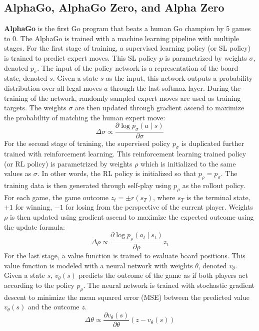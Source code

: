 \documentclass[12pt]{article}
\begin{document}
\subsection{AlphaGo, AlphaGo Zero, and Alpha Zero}
\textbf{AlphaGo} is the first Go program that beats a human Go champion by 5 games to 0.
The AlphaGo is trained with a machine learning pipeline with multiple stages.
For the first stage of training, a supervised learning policy (or SL policy) is trained to predict expert moves.
This SL policy $p$ is parametrized by weights $\sigma$, denoted $p_{\sigma}$.
The input of the policy network is a representation of the board state, denoted $s$.
Given a state $s$ as the input, this network outputs a probability distribution over all legal moves $a$ through the last softmax layer.
During the training of the network, randomly sampled expert moves are used as training targets.
The weights $\sigma$ are then updated through gradient ascend to maximize the probability of matching the human expert move:
$$
    \Delta \sigma \propto \frac{\partial \log p_{\sigma}(a \mid s)}{\partial \sigma}
$$
For the second stage of training, the supervised policy $p_{\sigma}$ is duplicated further trained with reinforcement learning.
This reinforcement learning trained policy (or RL policy) is parametrized by weights $\rho$ which is initialized to the same values as $\sigma$.
In other words, the RL policy is initialized so that $p_{\rho} = p_{\sigma}$.
The training data is then generated through self-play using $p_{\rho}$ as the rollout policy.
For each game, the game outcome $z_t = \pm r(s_T)$, where $s_T$ is the terminal state, $+1$ for winning, $-1$ for losing from the perspective of the current player.
Weights $\rho$ is then updated using gradient ascend to maximize the expected outcome using the update formula:
$$
    \Delta \rho \propto \frac{\partial \log p_{\rho}\left(a_{t} \mid s_{t}\right)}{\partial \rho} z_{t}
$$
For the last stage, a value function is trained to evaluate board positions.
This value function is modeled with a neural network with weights $\theta$, denoted $v_{\theta}$.
Given a state $s$, $v_{\theta}(s)$ predicts the outcome of the game as if both players act according to the policy $p_{\rho}$.
The neural network is trained with stochastic gradient descent to minimize the mean squared error (MSE) between the predicted value $v_{\theta}(s)$ and the outcome $z$.
$$
    \Delta \theta \propto \frac{\partial v_{\theta}(s)}{\partial \theta}\left(z-v_{\theta}(s)\right)
$$
\end{document}
